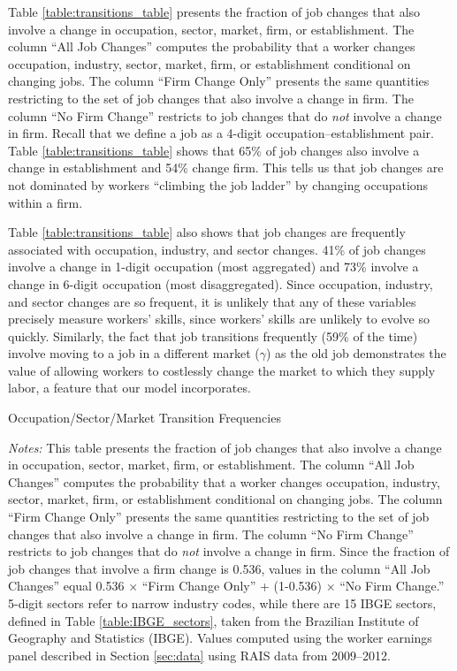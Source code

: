 \documentclass[12pt]{article}
\def\g{\gamma}
\theoremstyle{definition}
\theoremstyle{plain}
\begin{document}
Table \ref{table:transitions_table} presents the fraction of job changes that also involve a change in occupation, sector, market, firm, or establishment. The column ``All Job Changes'' computes the probability that a worker changes occupation, industry, sector, market, firm, or establishment conditional on changing jobs. The column ``Firm Change Only'' presents the same quantities restricting to the set of job changes that also involve a change in firm. The column ``No Firm Change'' restricts to job changes that do \emph{not} involve a change in firm. Recall that we define a job as a 4-digit occupation--establishment pair. Table \ref{table:transitions_table} shows that 65\% of job changes also involve a change in establishment and 54\% change firm. This tells us that job changes are not dominated by workers ``climbing the job ladder'' by changing occupations within a firm. 

Table \ref{table:transitions_table} also shows that job changes are frequently associated with occupation, industry, and sector changes. 41\% of job changes involve a change in 1-digit occupation (most aggregated) and 73\% involve a change in 6-digit occupation (most disaggregated). Since occupation, industry, and sector changes are so frequent, it is unlikely that any of these variables precisely measure workers' skills, since workers' skills are unlikely to evolve so quickly. Similarly, the fact that job transitions frequently (59\% of the time) involve moving to a job in a different market ($\g$) as the old job demonstrates the value of allowing workers to costlessly change the market to which they supply labor, a feature that our model incorporates. 



\begin{table}[h!] \centering
	\caption{Occupation/Sector/Market Transition Frequencies}
	\footnotesize\flushleft \emph{Notes:} This table presents the fraction of job changes that also involve a change in occupation, sector, market, firm, or establishment. The column ``All Job Changes'' computes the probability that a worker changes occupation, industry, sector, market, firm, or establishment conditional on changing jobs. The column ``Firm Change Only'' presents the same quantities restricting to the set of job changes that also involve a change in firm. The column ``No Firm Change'' restricts to job changes that do \emph{not} involve a change in firm. Since the fraction of job changes that involve a firm change is 0.536, values in the column ``All Job Changes'' equal 0.536 $\times$ ``Firm Change Only'' + (1-0.536) $\times$ ``No Firm Change.'' 5-digit sectors refer to narrow industry codes, while there are 15 IBGE sectors, defined in Table \ref{table:IBGE_sectors}, taken from the Brazilian Institute of Geography and Statistics (IBGE). Values computed using the worker earnings panel described in Section \ref{sec:data} using RAIS data from 2009--2012. 
	\label{table:transitions_table}
\end{table}
\end{document}

